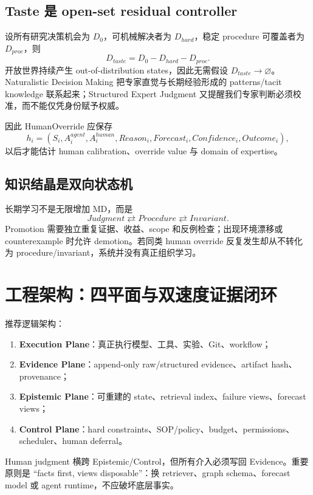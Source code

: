 \documentclass[11pt,a4paper]{ctexart}
\begin{document}
\subsection{Taste 是 open-set residual controller}
设所有研究决策机会为 $D_0$，可机械解决者为 $D_{hard}$，稳定 procedure 可覆盖者为 $D_{proc}$，则
\begin{equation}
D_{taste}=D_0-D_{hard}-D_{proc}.
\end{equation}
开放世界持续产生 out-of-distribution states，因此无需假设 $D_{taste}\to\varnothing$。Naturalistic Decision Making 把专家直觉与长期经验形成的 patterns/tacit knowledge 联系起来\cite{klein2015ndm}；Structured Expert Judgment 又提醒我们专家判断必须校准，而不能仅凭身份赋予权威\cite{colson2018expert,colson2017cross}。

因此 HumanOverride 应保存
\begin{equation}
h_i=(S_i,A_i^{agent},A_i^{human},Reason_i,Forecast_i,Confidence_i,Outcome_i),
\end{equation}
以后才能估计 human calibration、override value 与 domain of expertise。

\subsection{知识结晶是双向状态机}
长期学习不是无限增加 MD，而是
\begin{equation}
\boxed{Judgment\rightleftarrows Procedure\rightleftarrows Invariant.}
\end{equation}
Promotion 需要独立重复证据、收益、scope 和反例检查；出现环境漂移或 counterexample 时允许 demotion。若同类 human override 反复发生却从不转化为 procedure/invariant，系统并没有真正组织学习。

\section{工程架构：四平面与双速度证据闭环}

推荐逻辑架构：
\begin{enumerate}
\item \textbf{Execution Plane}：真正执行模型、工具、实验、Git、workflow；
\item \textbf{Evidence Plane}：append-only raw/structured evidence、artifact hash、provenance；
\item \textbf{Epistemic Plane}：可重建的 state、retrieval index、failure views、forecast views；
\item \textbf{Control Plane}：hard constraints、SOP/policy、budget、permissions、scheduler、human deferral。
\end{enumerate}
Human judgment 横跨 Epistemic/Control，但所有介入必须写回 Evidence。重要原则是 ``facts first, views disposable''：换 retriever、graph schema、forecast model 或 agent runtime，不应破坏底层事实。
\end{document}
